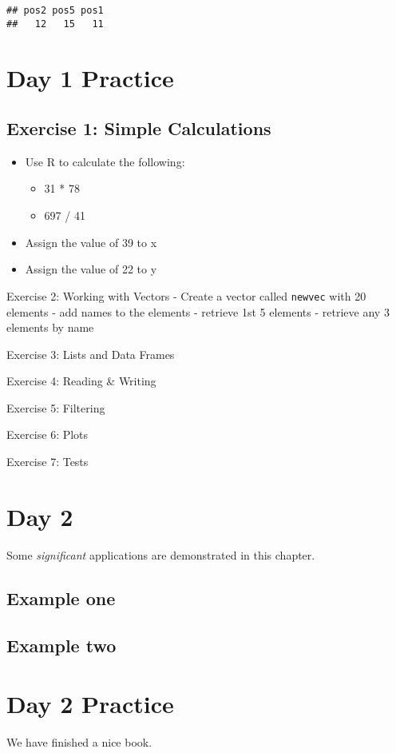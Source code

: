 \documentclass[
]{book}
\providecommand{\tightlist}{%
  \setlength{\itemsep}{0pt}\setlength{\parskip}{0pt}}
\begin{document}
\begin{verbatim}
## pos2 pos5 pos1 
##   12   15   11
\end{verbatim}

\chapter{Day 1 Practice}\label{day-1-practice}

\section{Exercise 1: Simple Calculations}\label{exercise-1-simple-calculations}

\begin{itemize}
\tightlist
\item
  Use R to calculate the following:

  \begin{itemize}
  \tightlist
  \item
    31 * 78
  \item
    697 / 41
  \end{itemize}
\item
  Assign the value of 39 to x
\item
  Assign the value of 22 to y
\end{itemize}

Exercise 2: Working with Vectors
- Create a vector called \texttt{newvec} with 20 elements
- add names to the elements
- retrieve 1st 5 elements
- retrieve any 3 elements by name

Exercise 3: Lists and Data Frames

Exercise 4: Reading \& Writing

Exercise 5: Filtering

Exercise 6: Plots

Exercise 7: Tests

\chapter{Day 2}\label{day-2}

Some \emph{significant} applications are demonstrated in this chapter.

\section{Example one}\label{example-one}

\section{Example two}\label{example-two}

\chapter{Day 2 Practice}\label{day-2-practice}

We have finished a nice book.

  
\end{document}
